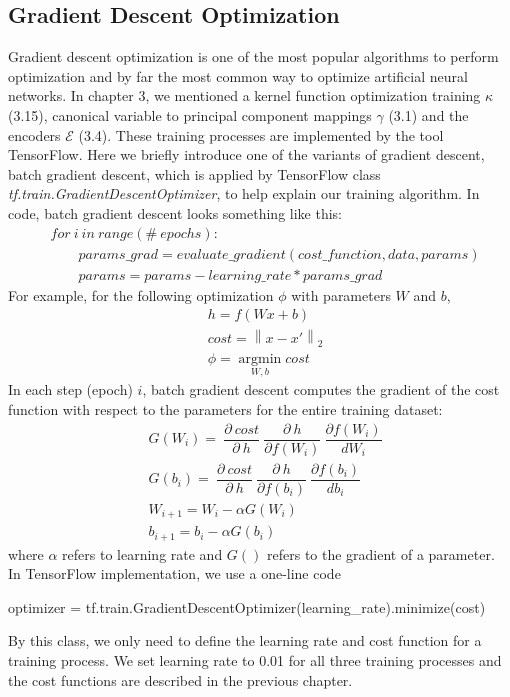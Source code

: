 \documentclass[12pt]{report} %
\newcommand{\norm}[1]{\left\lVert #1 \right\rVert}
\begin{document}
\subsection{Gradient Descent Optimization}
Gradient descent optimization\cite{GDO} is one of the most popular algorithms to perform optimization and by far the most common way to optimize artificial neural networks. In chapter 3, we mentioned a kernel function optimization training $\kappa$ (3.15), canonical variable to principal component mappings $\gamma$ (3.1) and the encoders $\mathcal{E}$ (3.4). These training processes are implemented by the tool TensorFlow. Here we briefly introduce one of the variants of gradient descent, batch gradient descent, which is applied by TensorFlow class \textit{tf.train.GradientDescentOptimizer}\cite{TFGDO}, to help explain our training algorithm. In code, batch gradient descent looks something like this:
\begin{equation}
\begin{split}
&for\ i\ in\ range ( \#\ epochs ): \\
&\qquad params\_grad = evaluate\_gradient ( cost\_function , data , params ) \\
&\qquad params = params - learning\_rate * params\_grad
\end{split}
\end{equation}
For example, for the following optimization $\phi$ with parameters $W$ and $b$,
\begin{equation}
\begin{split}
&h=f(Wx +b)\\
&cost=\norm{x-x'}_2\\
&\phi=\operatorname*{argmin}_{W,b}cost
\end{split}
\end{equation}
In each step (epoch) $i$, batch gradient descent computes the gradient of the cost function with respect to the parameters for the entire training dataset:
\begin{equation}
\begin{split}
&G({W_i})=\ \dfrac{\partial\ cost}{\partial\ h}\ \dfrac{\partial\ h}{\partial f(W_i)}\ \dfrac{\partial f(W_i)}{dW_i} \\
&G({b_i}) =\ \dfrac{\partial\ cost}{\partial\ h}\ \dfrac{\partial\ h}{\partial f(b_i)}\ \dfrac{\partial f(b_i)}{db_i} \\
&W_{i+1}=W_i - \alpha G(W_i) \\
&b_{i+1}=b_i - \alpha G(b_i)
\end{split}
\end{equation}
where $\alpha$ refers to learning rate and $G()$ refers to the gradient of a parameter. In TensorFlow implementation, we use a one-line code
\begin{center}
	optimizer = tf.train.GradientDescentOptimizer(learning\_rate).minimize(cost)
\end{center}
By this class, we only need to define the learning rate and cost function for a training process. We set learning rate to 0.01 for all three training processes and the cost functions are described in the previous chapter.
\end{document}
